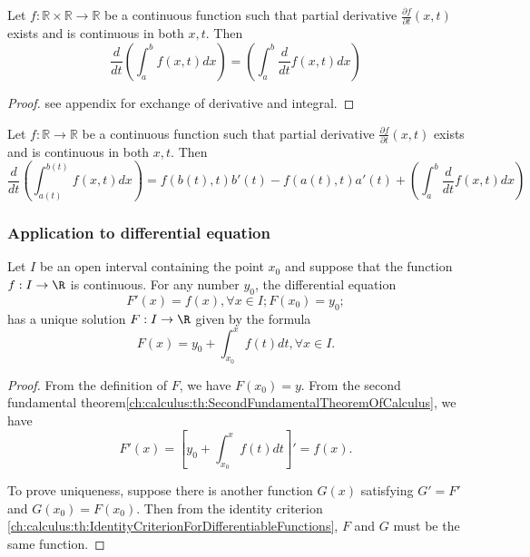 \begin{refsection}
\begin{lemma}
	Let $f:\mathbb{R}\times \mathbb{R}\rightarrow \mathbb{R}$ be a continuous function such that partial derivative $\frac{\partial f}{\partial t}(x,t)$ exists and is continuous in both $x,t$. Then 
	$$\frac{d}{dt}(\int_{a}^{b}f(x,t)dx) = (\int_{a}^{b}\frac{d}{dt}f(x,t)dx)$$
\end{lemma}
\begin{proof}
	see appendix for exchange of derivative and integral.
\end{proof}


\begin{corollary}
	Let $f:\mathbb{R}\rightarrow \mathbb{R}$ be a continuous function such that partial derivative $\frac{\partial f}{\partial t}(x,t)$ exists and is continuous in both $x,t$.	
	Then 
	$$\frac{d}{dt}(\int_{a(t)}^{b(t)}f(x,t)dx) = f(b(t),t)b'(t)-f(a(t),t)a'(t)+ (\int_{a}^{b}\frac{d}{dt}f(x,t)dx)$$
\end{corollary}




\subsubsection{Application to differential equation}
\begin{lemma}Let $I$ be an open interval containing the point $x_0$ and suppose that the function $f:I\to \R$ is continuous. For any number $y_0$, the differential equation
	$$F'(x) = f(x), \forall x\in I; F(x_0) = y_0;$$
has a unique solution $F:I\to \R$ given by the formula
$$F(x) = y_0 + \int_{x_0}^x f(t)dt, \forall x\in I.$$
\end{lemma}
\begin{proof}
From the definition of $F$, we have $F(x_0) = y$. From the second fundamental theorem\autoref{ch:calculus:th:SecondFundamentalTheoremOfCalculus}, we have
$$F'(x) = [y_0 + \int_{x_0}^x f(t)dt]' = f(x).$$

To prove uniqueness, suppose there is another function $G(x)$ satisfying $G'= F'$ and $G(x_0) = F(x_0)$. Then from the identity criterion \autoref{ch:calculus:th:IdentityCriterionForDifferentiableFunctions}, $F$ and $G$ must be the same function.
\end{proof}





\end{refsection}
